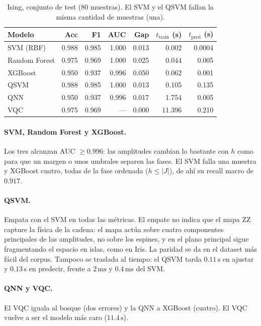 \begin{table}[!htbp]
\centering
\small
\begin{tabular}{lrrrrrr}
\toprule
\textbf{Modelo} & \textbf{Acc} & \textbf{F1} & \textbf{AUC} & \textbf{Gap} & $t_{\mathrm{train}}$ (s) & $t_{\mathrm{pred}}$ (s) \\
\midrule
SVM (RBF) & 0.988 & 0.985 & 1.000 & 0.013 & 0.002 & 0.0004 \\
Random Forest & 0.975 & 0.969 & 1.000 & 0.025 & 0.044 & 0.005 \\
XGBoost & 0.950 & 0.937 & 0.996 & 0.050 & 0.062 & 0.001 \\
QSVM & 0.988 & 0.985 & 1.000 & 0.013 & 0.105 & 0.135 \\
QNN & 0.950 & 0.937 & 0.996 & 0.017 & 1.754 & 0.005 \\
VQC & 0.975 & 0.969 & --- & 0.000 & 11.396 & 0.210 \\
\bottomrule
\end{tabular}
\caption{Ising, conjunto de test (80 muestras). El SVM y el QSVM fallan la misma cantidad de muestras (una).}
\label{tab:res_ising}
\end{table}

\paragraph{SVM, Random Forest y XGBoost.} Los tres alcanzan AUC $\geq 0.996$: las amplitudes cambian lo bastante con $h$ como para que un margen o unos umbrales separen las fases. El SVM falla una muestra y XGBoost cuatro, todas de la fase ordenada ($h\le|J|$), de ahí su recall macro de $0.917$.

\paragraph{QSVM.} Empata con el SVM en todas las métricas. El empate no indica que el mapa ZZ capture la física de la cadena: el mapa actúa sobre cuatro componentes principales de las amplitudes, no sobre los espines, y en el plano principal sigue fragmentando el espacio en islas, como en Iris. La paridad se da en el dataset más fácil del corpus. Tampoco se traslada al tiempo: el QSVM tarda $0.11\,\mathrm{s}$ en ajustar y $0.13\,\mathrm{s}$ en predecir, frente a $2\,\mathrm{ms}$ y $0.4\,\mathrm{ms}$ del SVM.

\paragraph{QNN y VQC.} El VQC iguala al bosque (dos errores) y la QNN a XGBoost (cuatro). El VQC vuelve a ser el modelo más caro ($11.4\,\mathrm{s}$).

